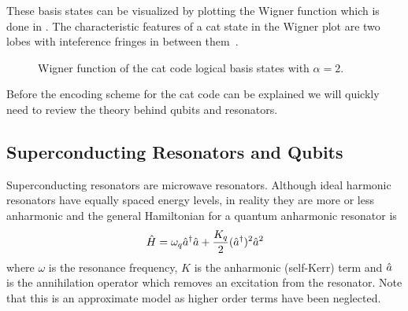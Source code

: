 \documentclass[main.tex]{subfiles}
\begin{document}
These basis states can be visualized by plotting the Wigner function which is done in . The characteristic features of a cat state in the Wigner plot are two lobes with inteference fringes in between them~\cite{girvin_schrodinger_2017}.

\begin{figure}[H]
	\centering
	\caption{%
	Wigner function of the cat code logical basis states with \(\alpha = 2\).
	}%
	\label{fig:cat-code-basis-wigner}
\end{figure}

Before the encoding scheme for the cat code can be explained we will quickly need to review the theory behind qubits and resonators.

\subsection{Superconducting Resonators and Qubits}
Superconducting resonators are microwave resonators.
Although ideal harmonic resonators have equally spaced energy levels, in reality they are more or less anharmonic and the general Hamiltonian for a quantum anharmonic resonator is
\begin{equation}
    \hat{H} = \omega_{q} \hat{a}^\dagger\hat{a} + \frac{K_q}{2} (\hat{a}^\dagger)^2\hat{a}^2
    \label{eq:resonator-hamiltonian}
\end{equation}
where \( \omega \) is the resonance frequency, \( K \) is the anharmonic (self-Kerr) term and \(\hat{a}\) is the annihilation operator which removes an excitation from the resonator.
Note that this is an approximate model as higher order terms have been neglected.
\end{document}
